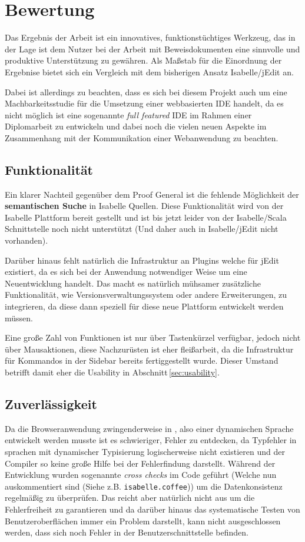 \chapter{Bewertung}

Das Ergebnis der Arbeit ist ein innovatives, funktionstüchtiges Werkzeug, das in der Lage ist dem
Nutzer bei der Arbeit mit Beweisdokumenten eine sinnvolle und produktive Unterstützung zu gewähren.
Als Maßstab für die Einordnung der Ergebnise bietet sich ein Vergleich mit dem bisherigen Ansatz
Isabelle/jEdit an. 

Dabei ist allerdings zu beachten, dass es sich bei diesem Projekt auch um eine Machbarkeitsstudie
für die Umsetzung einer webbasierten IDE handelt, da es nicht möglich ist eine sogenannte
\textit{full featured} IDE im Rahmen einer Diplomarbeit zu entwickeln und dabei noch die vielen
neuen Aspekte im Zusammenhang mit der Kommunikation einer Webanwendung zu beachten.

\section{Funktionalität}

Ein klarer Nachteil gegenüber dem Proof General ist die fehlende Möglichkeit der
\textbf{semantischen Suche} in Isabelle Quellen. Diese Funktionalität wird von der Isabelle
Plattform bereit gestellt und ist bis jetzt leider von der Isabelle/Scala Schnittstelle noch nicht
unterstützt (Und daher auch in Isabelle/jEdit nicht vorhanden).

Darüber hinaus fehlt natürlich die Infrastruktur an Plugins welche für jEdit existiert, da es sich
bei der Anwendung notwendiger Weise um eine Neuentwicklung handelt. Das macht es natürlich mühsamer
zusätzliche Funktionalität, wie Versionsverwaltungssystem oder andere Erweiterungen, zu integrieren,
da diese dann speziell für diese neue Plattform entwickelt werden müssen.

Eine große Zahl von Funktionen ist nur über Tastenkürzel verfügbar, jedoch nicht über Mausaktionen,
diese Nachzurüsten ist eher fleißarbeit, da die Infrastruktur für Kommandos in der Sidebar bereits
fertiggestellt wurde. Dieser Umstand betrifft damit eher die Usability in
Abschnitt\,\ref{sec:usability}.

\section{Zuverlässigkeit}

Da die Browseranwendung zwingenderweise in , also einer dynamischen Sprache entwickelt
werden musste ist es schwieriger, Fehler zu entdecken, da Typfehler in sprachen mit dynamischer
Typisierung logischerweise nicht existieren und der Compiler so keine große Hilfe bei der
Fehlerfindung darstellt. Während der Entwicklung wurden sogenannte \textit{cross checks} im Code
geführt (Welche nun auskommentiert sind (Siehe z.B. \texttt{isabelle.coffee})) um die
Datenkonsistenz regelmäßig zu überprüfen. Das reicht aber natürlich nicht aus um die Fehlerfreiheit
zu garantieren und da darüber hinaus das systematische Testen von Benutzeroberflächen immer ein
Problem darstellt, kann nicht ausgeschlossen werden, dass sich noch Fehler in der
Benutzerschnittstelle befinden.

